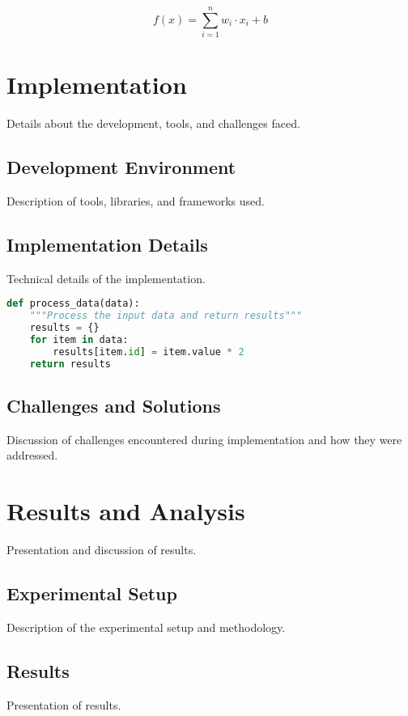 \documentclass[12pt,a4paper]{report}
\begin{document}
\begin{equation}
    f(x) = \sum_{i=1}^{n} w_i \cdot x_i + b
    \label{eq:model}
\end{equation}

\chapter{Implementation}

Details about the development, tools, and challenges faced.

\section{Development Environment}
Description of tools, libraries, and frameworks used.

\section{Implementation Details}
Technical details of the implementation.

\begin{lstlisting}[language=Python, caption=Example Python code]
def process_data(data):
    """Process the input data and return results"""
    results = {}
    for item in data:
        results[item.id] = item.value * 2
    return results
\end{lstlisting}

\section{Challenges and Solutions}
Discussion of challenges encountered during implementation and how they were addressed.

\chapter{Results and Analysis}

Presentation and discussion of results.

\section{Experimental Setup}
Description of the experimental setup and methodology.

\section{Results}
Presentation of results.
\end{document}
